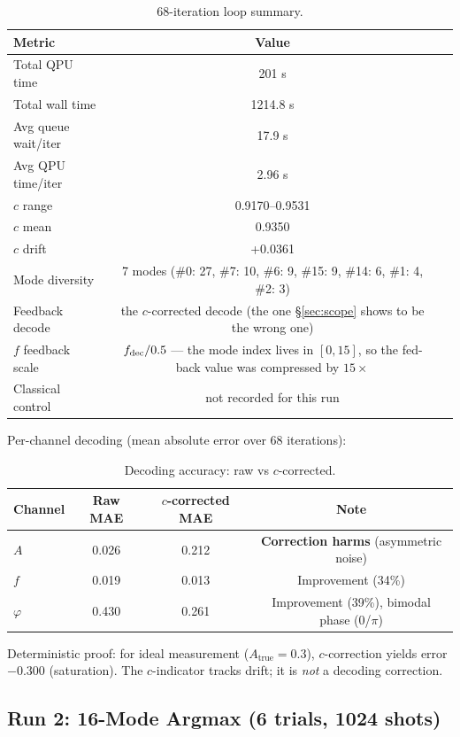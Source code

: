 \documentclass[sigconf,anonymous=false]{acmart}
\begin{document}
\begin{table}[h]
\centering
\caption{68-iteration loop summary.}
\label{tab:loop68}
\begin{tabular}{lcc}
\toprule
Metric & Value \\
\midrule
Total QPU time & 201 s \\
Total wall time & 1214.8 s \\
Avg queue wait/iter & 17.9 s \\
Avg QPU time/iter & 2.96 s \\
$c$ range & 0.9170--0.9531 \\
$c$ mean & 0.9350 \\
$c$ drift & +0.0361 \\
Mode diversity & 7 modes (\#0: 27, \#7: 10, \#6: 9, \#15: 9, \#14: 6, \#1: 4, \#2: 3) \\
Feedback decode & the $c$-corrected decode (the one \S\ref{sec:scope} shows to be the wrong one) \\
$f$ feedback scale & $f_{\rm dec}/0.5$ --- the mode index lives in $[0,15]$, so the fed-back value was compressed by $15\times$ \\
Classical control & not recorded for this run \\
\bottomrule
\end{tabular}
\end{table}

Per-channel decoding (mean absolute error over 68 iterations):

\begin{table}[h]
\centering
\caption{Decoding accuracy: raw vs $c$-corrected.}
\label{tab:decoding68}
\begin{tabular}{lccc}
\toprule
Channel & Raw MAE & $c$-corrected MAE & Note \\
\midrule
$A$ & 0.026 & 0.212 & \textbf{Correction harms} (asymmetric noise) \\
$f$ & 0.019 & 0.013 & Improvement (34\%) \\
$\varphi$ & 0.430 & 0.261 & Improvement (39\%), bimodal phase (0/$\pi$) \\
\bottomrule
\end{tabular}
\end{table}

Deterministic proof: for ideal measurement ($A_\text{true}=0.3$), $c$-correction yields error $-0.300$ (saturation). The $c$-indicator tracks drift; it is \emph{not} a decoding correction.

\subsection{Run 2: 16-Mode Argmax (6 trials, 1024 shots)}
\end{document}
